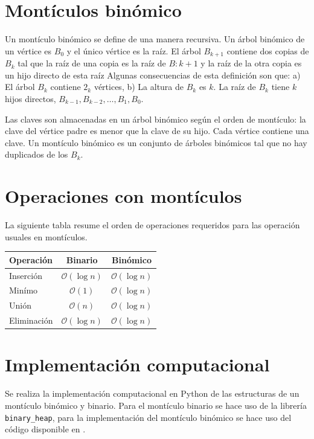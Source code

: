 \documentclass[letterpaper,11pt]{article}
\begin{document}
\section{Montículos binómico}

Un montículo binómico se define de una manera recursiva. Un árbol binómico de un vértice es $B_0$ y el único vértice es la raíz. El árbol $B_{k+1}$ contiene dos copias de $B_k$ tal que la raíz de una copia es la raíz de $B:k+1$ y la raíz de la otra copia es un hijo directo de esta raíz Algunas consecuencias de esta definición son que: a) El árbol $B_k$ contiene $2_k$ vértices, b) La altura de $B_k$ es $k$. La raíz de $B_k$ tiene $k$ hijos directos, $B_{k-1}, B_{k-2}, \dots, B_1, B_0$.

Las claves son almacenadas en un árbol binómico según el orden de montículo: la clave del vértice padre es menor que la clave de su hijo. Cada vértice contiene una clave. Un montículo binómico es un conjunto de árboles binómicos tal que no hay duplicados de los $B_k$. \cite{Schaeffer2020} 

\section{Operaciones con montículos}

La siguiente tabla resume el orden de operaciones requeridos para las operación usuales en montículos.

\begin{table}[h!]
\centering
\begin{tabular}{l|c|c}
Operación   & Binario & Binómico \\\hline
Inserción   &  $\mathcal{O}(\log n)$      & $\mathcal{O}(\log n)$       \\
Minímo      & $\mathcal{O}(1)$       & $\mathcal{O}(\log n)$        \\
Unión       & $\mathcal{O}(n)$       & $\mathcal{O}(\log n)$       \\
Eliminación & $\mathcal{O}(\log n)$     & $\mathcal{O}(\log n)$      
\end{tabular}
\label{tbl:ope}
\end{table}


\section{Implementación computacional}

Se realiza la implementación computacional en Python de las estructuras de un montículo binómico y binario. Para el montículo binario se hace uso de la librería \texttt{binary\_heap}, para la implementación del montículo binómico se hace uso del código disponible en \cite{Nayuki2018}. 
\end{document}
